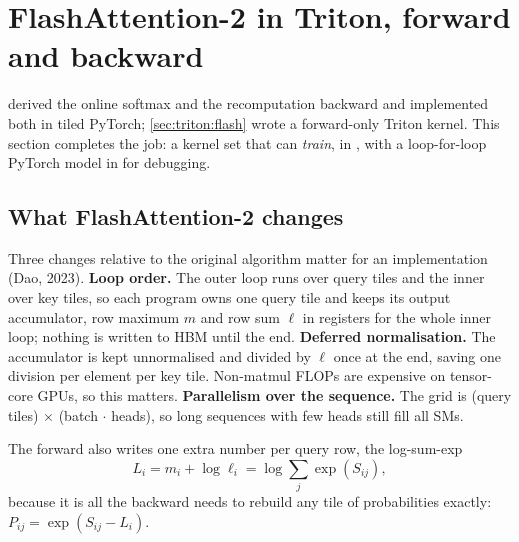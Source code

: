 \section{FlashAttention-2 in Triton, forward and backward}\label{sec:perf:fa2}

 derived the online softmax and the recomputation backward and
implemented both in tiled PyTorch; \cref{sec:triton:flash} wrote a forward-only Triton kernel. This
section completes the job: a kernel set that can \emph{train}, in
, with a loop-for-loop PyTorch model in
 for debugging.

\subsection{What FlashAttention-2 changes}

Three changes relative to the original algorithm matter for an implementation (Dao, 2023).
\textbf{Loop order.} The outer loop runs over query tiles and the inner over key tiles, so each
program owns one query tile and keeps its output accumulator, row maximum $m$ and row sum $\ell$ in
registers for the whole inner loop; nothing is written to HBM until the end. \textbf{Deferred
normalisation.} The accumulator is kept unnormalised and divided by $\ell$ once at the end, saving
one division per element per key tile. Non-matmul FLOPs are expensive on tensor-core GPUs, so this
matters. \textbf{Parallelism over the sequence.} The grid is (query tiles) $\times$ (batch $\cdot$
heads), so long sequences with few heads still fill all SMs.

The forward also writes one extra number per query row, the log-sum-exp
\begin{equation}
L_i = m_i + \log \ell_i = \log\sum_j \exp(S_{ij}),
\label{eq:perf:lse}
\end{equation}
because it is all the backward needs to rebuild any tile of probabilities exactly:
$P_{ij}=\exp(S_{ij}-L_i)$.

